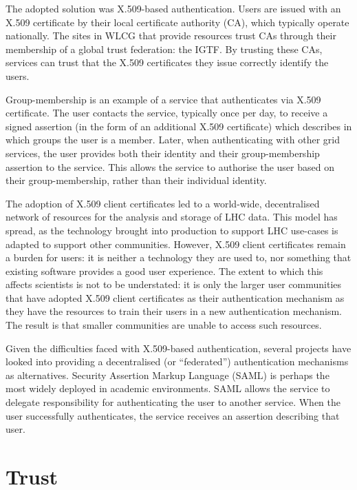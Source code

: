 \documentclass[a4paper]{jpconf}
\begin{document}
The adopted solution was X.509-based authentication.  Users are issued
with an X.509 certificate by their local certificate authority (CA),
which typically operate nationally.  The sites in WLCG that provide
resources trust CAs through their membership of a global trust
federation: the IGTF.  By trusting these CAs, services can trust that
the X.509 certificates they issue correctly identify the users.

Group-membership is an example of a service that authenticates via
X.509 certificate.  The user contacts the service, typically once per
day, to receive a signed assertion (in the form of an additional X.509
certificate) which describes in which groups the user is a member.
Later, when authenticating with other grid services, the user provides
both their identity and their group-membership assertion to the
service.  This allows the service to authorise the user based on their
group-membership, rather than their individual identity.

The adoption of X.509 client certificates led to a world-wide,
decentralised network of resources for the analysis and storage of LHC
data.  This model has spread, as the technology brought into
production to support LHC use-cases is adapted to support other
communities.  However, X.509 client certificates remain a burden for
users: it is neither a technology they are used to, nor something that
existing software provides a good user experience.  The extent to
which this affects scientists is not to be understated: it is only the
larger user communities that have adopted X.509 client certificates as
their authentication mechanism as they have the resources to train
their users in a new authentication mechanism.  The result is that
smaller communities are unable to access such resources.

Given the difficulties faced with X.509-based authentication, several
projects have looked into providing a decentralised (or ``federated'')
authentication mechanisms as alternatives.  Security Assertion Markup
Language (SAML) is perhaps the most widely deployed in academic
environments.  SAML allows the service to delegate responsibility for
authenticating the user to another service.  When the user
successfully authenticates, the service receives an assertion
describing that user.

\section{Trust}
\end{document}
